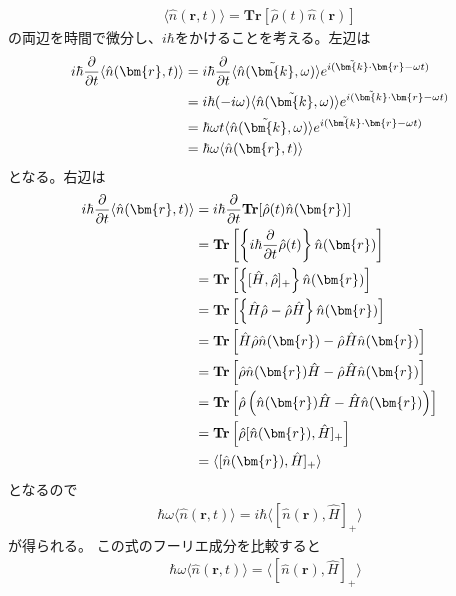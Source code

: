 \documentclass[dvipdfmx, 11pt, a4paper]{jsarticle}
\numberwithin{equation}{section}
\theoremstyle{definition}
\begin{document}
    \begin{derivationBox}
        \begin{align}
            \langle \hat{n}(\bm{r},t) \rangle = \mathbf{Tr}[\hat{\rho}(t)\hat{n}(\bm{r})]
        \end{align}
        の両辺を時間で微分し、$i\hbar$をかけることを考える。左辺は
        \begin{align}
            i\hbar \frac{\partial}{\partial t}\langle \hat{n}(\bm{r},t) \rangle &= i\hbar \frac{\partial}{\partial t} \langle \hat{n}(\tilde{\bm{k}},\omega) \rangle e^{i(\tilde{\bm{k}} \cdot \bm{r}-\omega t)} \notag \\
            &= i\hbar (-i\omega) \langle \hat{n}(\tilde{\bm{k}},\omega) \rangle e^{i(\tilde{\bm{k}} \cdot \bm{r}-\omega t)} \notag \\
            &= \hbar \omega t \langle \hat{n}(\tilde{\bm{k}},\omega) \rangle e^{i(\tilde{\bm{k}} \cdot \bm{r}-\omega t)} \notag \\
            &=  \hbar \omega \langle \hat{n}(\bm{r},t) \rangle
        \end{align}
        となる。右辺は
        \begin{align}
            i\hbar \frac{\partial }{\partial t} \langle \hat{n}(\bm{r},t) \rangle &= i\hbar \frac{\partial}{\partial t}  \mathbf{Tr}[\hat{\rho}(t)\hat{n}(\bm{r})] \notag \\
            &=  \mathbf{Tr}\left[ \left\{ i\hbar\frac{\partial}{\partial t}\hat{\rho}(t) \right\} \hat{n}(\bm{r}) \right] \notag \\
            &=  \mathbf{Tr}\left[ \left\{ [\hat{H},\hat{\rho}]_+ \right\} \hat{n}(\bm{r}) \right] \notag \\
            &=  \mathbf{Tr}\left[ \left\{ \hat{H}\hat{\rho} - \hat{\rho}\hat{H} \right\} \hat{n}(\bm{r}) \right] \notag \\
            &= \mathbf{Tr}\left[  \hat{H}\hat{\rho} \hat{n}(\bm{r}) - \hat{\rho}\hat{H} \hat{n}(\bm{r}) \right] \notag \\
            &= \mathbf{Tr}\left[  \hat{\rho} \hat{n}(\bm{r}) \hat{H} - \hat{\rho}\hat{H} \hat{n}(\bm{r}) \right] \notag \\
            &= \mathbf{Tr}\left[  \hat{\rho}\left( \hat{n}(\bm{r}) \hat{H} - \hat{H} \hat{n}(\bm{r}) \right) \right] \notag \\
            &= \mathbf{Tr}\left[  \hat{\rho} [\hat{n}(\bm{r}), \hat{H}]_+ \right] \notag \\
            &= \langle [\hat{n}(\bm{r}), \hat{H}]_+ \rangle
        \end{align}
        となるので
        \begin{align}
            \hbar \omega \langle \hat{n}(\bm{r},t) \rangle = i\hbar \langle [\hat{n}(\bm{r}), \hat{H}]_+ \rangle
        \end{align}
        が得られる。
        この式のフーリエ成分を比較すると
        \begin{align}
            &\hbar \omega \langle \hat{n}(\bm{r},t) \rangle =  \langle [\hat{n}(\bm{r}), \hat{H}]_+ \rangle 
        \end{align}
    \end{derivationBox}
\end{document}
